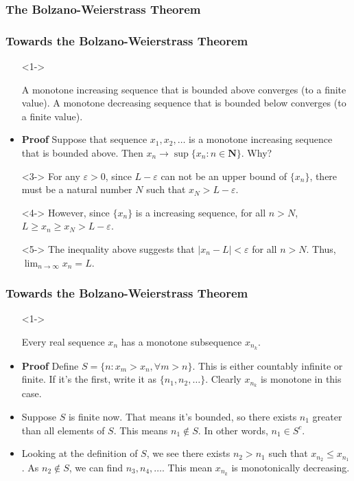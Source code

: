 \documentclass[handout]{beamer}
\begin{document}
\subsubsection{The Bolzano-Weierstrass Theorem}

\frame
{
  \frametitle{Towards the Bolzano-Weierstrass Theorem}

  \begin{itemize}
  \item [] <1-> \begin{Lemma} A monotone increasing sequence that is bounded above converges (to a finite value). A monotone decreasing sequence that is bounded below converges (to a finite value). \end{Lemma} 

    \item<2-> \textbf{Proof} Suppose that sequence $x_1,x_2,\ldots$ is a monotone increasing sequence that is bounded above. Then $x_n \to \sup\{x_n: n\in \mathbf{N}\}$. Why?

    \item[]<3->  For any $\varepsilon>0$, since $L-\varepsilon$ can not be an upper bound of $\{x_n\}$, there must be a natural number $N$ such that $x_N>L-\varepsilon$. 
        \item[]<4-> However, since $\{x_n\} $ is a increasing sequence, for all $n>N$, $L\geq x_n\geq x_N>L-\varepsilon$. 
        
         \item[]<5->  The inequality above suggests that $|x_n-L|<\varepsilon$ for all $n>N$. Thus, $\lim_{n\rightarrow\infty} x_n=L$.         
  \end{itemize}
}


\frame
{
  \frametitle{Towards the Bolzano-Weierstrass Theorem}

  \begin{itemize}
  \item [] <1-> \begin{Lemma} Every real sequence $x_n$ has a monotone subsequence $x_{n_k}$. \end{Lemma} 
  
  \item<2-> \textbf{Proof} Define $S = \{ n : x_m > x_n, \forall m > n \}$. This is either countably infinite or finite. If it's the first, write it as $\{n_1, n_2, \ldots\}$. Clearly $x_{n_k}$ is monotone in this case. 
  
  \item<3-> Suppose $S$ is finite now. That means it's bounded, so there exists $n_1$ greater than all elements of $S$. This means $n_1 \notin S$. In other words, $n_1 \in S^c$. 
  
  \item<4-> Looking at the definition of $S$, we see there exists $n_2 > n_1$ such that $x_{n_2} \le  x_{n_1}$.  As $n_2 \notin S$, we can find $n_3, n_4, \ldots$. This mean $x_{n_k}$ is monotonically decreasing. 
  
  
  \end{itemize}
}
\end{document}
